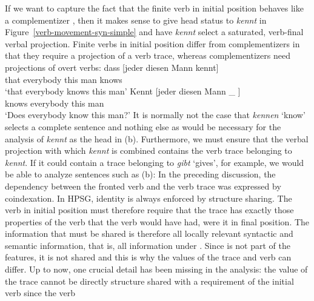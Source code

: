 If we want to capture the fact that the finite verb in initial position behaves like a complementizer \citep{Hoehle97a}, then it makes sense to
give head status to \emph{kennt} in Figure~\ref{verb-movement-syn-simple} and have \emph{kennt} select a saturated, verb-final verbal projection.
Finite verbs in initial position differ from complementizers in that they require a projection of a verb trace, whereas complementizers need projections
of overt verbs:
\eal
\ex 
\gll dass [jeder diesen Mann kennt]\\
     that \spacebr{}everybody this man knows\\
\glt `that everybody knows this man'
\ex 
\gll Kennt [jeder diesen Mann \_ ]\\
	 knows \spacebr{}everybody this man\\
\glt `Does everybody know this man?'
\zl
It is normally not the case that \emph{kennen} `know' selects a complete sentence and nothing else as would be necessary for the analysis of 
\emph{kennt} as the head in (b). Furthermore, we must ensure that the verbal projection with which \emph{kennt} is combined contains the verb trace belonging to
\emph{kennt}. If it could contain a trace belonging to \emph{gibt} `gives', for example, we would be able to analyze sentences such as (b):
\eal
{}
\zl
In the preceding discussion, the dependency between the fronted verb and the verb trace was expressed by coindexation. In HPSG, identity is always
enforced by structure sharing. The verb in initial position must therefore require that the trace
has exactly those properties of the verb that the verb would have had, were it in final
position. The information that must be shared is therefore all locally relevant syntactic and
semantic information, that is, all information under \local. Since \phon is not part of the \local features, it is not shared and this is why the \phon values of the trace and verb can
differ. Up to now, one crucial detail has been missing in the analysis: the \local value of the
trace cannot be directly structure shared with a requirement of the initial verb since the verb
